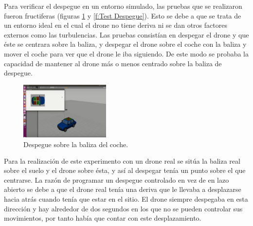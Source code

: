 \hspace{1cm} Para verificar el despegue en un entorno simulado, las pruebas que se realizaron fueron fructiferas (figuras \ref{fig:Despegue sobre la baliza del coche} y \ref{f:Test Despegue}). Esto se debe a que se trata de un entorno ideal en el cual el drone no tiene deriva ni se dan otros factores externos como las turbulencias. Las pruebas consist\'ian en despegar el drone y que \'este se centrara sobre la baliza, y despegar el drone sobre el coche con la baliza y mover el coche para ver que el drone le iba siguiendo. De este modo se probaba la capacidad de mantener al drone m\'as o menos centrado sobre la baliza de despegue.%

\begin{figure}[H]
	\centering
		\includegraphics[width=0.4\textwidth]{imgs/TakeOff.jpg}
        \caption{Despegue sobre la baliza del coche.}
	\label{fig:Despegue sobre la baliza del coche}
\end{figure}


\hspace{1cm} Para la realizaci\'on de este experimento con un drone real se sit\'ua la baliza real sobre el suelo y el drone sobre \'esta, y as\'i al despegar ten\'ia un punto sobre el que centrarse. La raz\'on de programar un despegue controlado en vez de en lazo abierto se debe a que el drone real ten\'ia una deriva que le llevaba a desplazarse hacia atr\'as cuando ten\'ia que estar en el sitio. El drone siempre despegaba en esta direcci\'on y hay alrededor de dos segundos en los que no se pueden controlar sus movimientos, por tanto hab\'ia que contar con este desplazamiento. 


